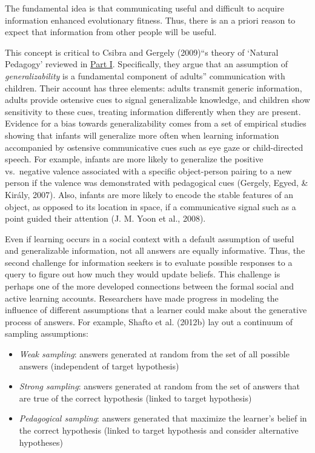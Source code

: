 \documentclass[english,floatsintext,man]{apa6}
\providecommand{\tightlist}{%
  \setlength{\itemsep}{0pt}\setlength{\parskip}{0pt}}
\theoremstyle{definition}
\theoremstyle{definition}
\theoremstyle{definition}
\theoremstyle{remark}
\begin{document}
\noindent
The fundamental idea is that communicating useful and difficult to
acquire information enhanced evolutionary fitness. Thus, there is an a
priori reason to expect that information from other people will be
useful.

This concept is critical to Csibra and Gergely (2009)\enquote{s theory
of \enquote{Natural Pedagogy} reviewed in \protect\hyperlink{p1}{Part
I}. Specifically, they argue that an assumption of
\emph{generalizability} is a fundamental component of adults}
communication with children. Their account has three elements: adults
transmit generic information, adults provide ostensive cues to signal
generalizable knowledge, and children show sensitivity to these cues,
treating information differently when they are present. Evidence for a
bias towards generalizability comes from a set of empirical studies
showing that infants will generalize more often when learning
information accompanied by ostensive communicative cues such as eye gaze
or child-directed speech. For example, infants are more likely to
generalize the positive vs.~negative valence associated with a specific
object-person pairing to a new person if the valence was demonstrated
with pedagogical cues (Gergely, Egyed, \& Király, 2007). Also, infants
are more likely to encode the stable features of an object, as opposed
to its location in space, if a communicative signal such as a point
guided their attention (J. M. Yoon et al., 2008).

Even if learning occurs in a social context with a default assumption of
useful and generalizable information, not all answers are equally
informative. Thus, the second challenge for information seekers is to
evaluate possible responses to a query to figure out how much they would
update beliefs. This challenge is perhaps one of the more developed
connections between the formal social and active learning accounts.
Researchers have made progress in modeling the influence of different
assumptions that a learner could make about the generative process of
answers. For example, Shafto et al. (2012b) lay out a continuum of
sampling assumptions:

\begin{itemize}
\tightlist
\item
  \emph{Weak sampling}: answers generated at random from the set of all
  possible answers (independent of target hypothesis)
\item
  \emph{Strong sampling}: answers generated at random from the set of
  answers that are true of the correct hypothesis (linked to target
  hypothesis)
\item
  \emph{Pedagogical sampling}: answers generated that maximize the
  learner's belief in the correct hypothesis (linked to target
  hypothesis and consider alternative hypotheses)
\end{itemize}
\end{document}
